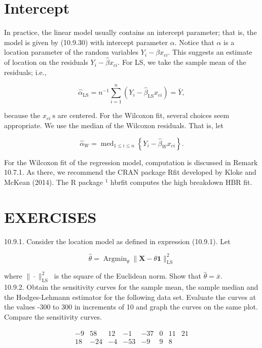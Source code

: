 \section*{Intercept}
In practice, the linear model usually contains an intercept parameter; that is, the model is given by (10.9.30) with intercept parameter $\alpha$. Notice that $\alpha$ is a location parameter of the random variables $Y_{i}-\beta x_{c i}$. This suggests an estimate of location on the residuals $Y_{i}-\widehat{\beta} x_{c i}$. For LS, we take the sample mean of the residuals; i.e.,


\begin{equation*}
\widehat{\alpha}_{\mathrm{LS}}=n^{-1} \sum_{i=1}^{n}\left(Y_{i}-\widehat{\beta}_{\mathrm{LS}} x_{c i}\right)=\bar{Y}, \tag{10.9.50}
\end{equation*}


because the $x_{c i} \mathrm{~s}$ are centered. For the Wilcoxon fit, several choices seem appropriate. We use the median of the Wilcoxon residuals. That is, let


\begin{equation*}
\widehat{\alpha}_{W}=\operatorname{med}_{1 \leq i \leq n}\left\{Y_{i}-\widehat{\beta}_{W} x_{c i}\right\} . \tag{10.9.51}
\end{equation*}


For the Wilcoxon fit of the regression model, computation is discussed in Remark 10.7.1. As there, we recommend the CRAN package Rfit developed by Kloke and McKean (2014). The R package ${ }^{1}$ hbrfit computes the high breakdown HBR fit.

\section*{EXERCISES}
10.9.1. Consider the location model as defined in expression (10.9.1). Let

$$
\widehat{\theta}=\operatorname{Argmin}_{\theta}\|\mathbf{X}-\theta \mathbf{1}\|_{\mathrm{LS}}^{2}
$$

where $\|\cdot\|_{\text {LS }}^{2}$ is the square of the Euclidean norm. Show that $\hat{\theta}=\bar{x}$.\\
10.9.2. Obtain the sensitivity curves for the sample mean, the sample median and the Hodges-Lehmann estimator for the following data set. Evaluate the curves at the values -300 to 300 in increments of 10 and graph the curves on the same plot. Compare the sensitivity curves.

$$
\begin{array}{rrrrrrrr}
-9 & 58 & 12 & -1 & -37 & 0 & 11 & 21 \\
18 & -24 & -4 & -53 & -9 & 9 & 8 &
\end{array}
$$

